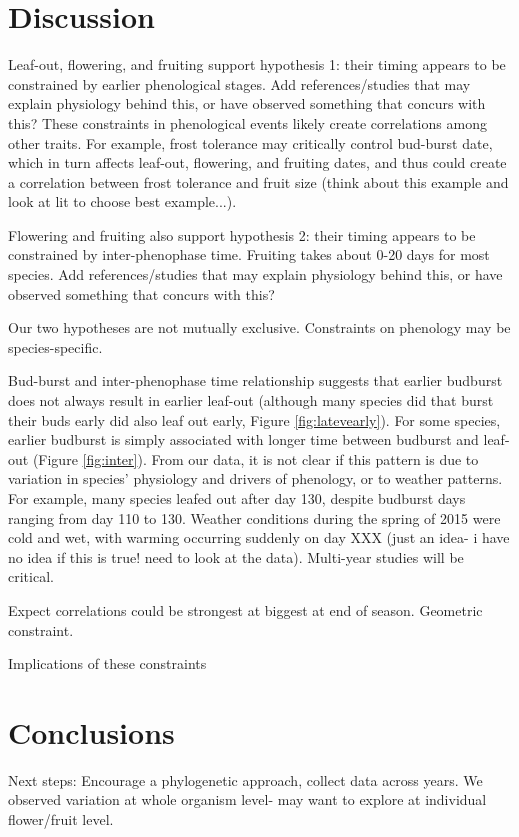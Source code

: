 \documentclass{article}
\begin{document}
\section* {Discussion}

Leaf-out, flowering, and fruiting support hypothesis 1: their timing appears to be constrained by earlier phenological stages.  
Add references/studies that may explain physiology behind this, or have observed something that concurs with this? These constraints in phenological events likely create correlations among other traits. For example, frost tolerance may critically control bud-burst date, which in turn affects leaf-out, flowering, and fruiting dates, and thus could create a correlation between frost tolerance and fruit size (think about this example and look at lit to choose best example...).
\par Flowering and fruiting also support hypothesis 2: their timing appears to be constrained by inter-phenophase time. Fruiting takes about 0-20 days for most species. Add references/studies that may explain physiology behind this, or have observed something that concurs with this?

\par Our two hypotheses are not mutually exclusive. Constraints on phenology may be species-specific. 
\par Bud-burst and inter-phenophase time relationship suggests that earlier budburst does not always result in earlier leaf-out (although many species did that burst their buds early did also leaf out early, Figure \ref{fig:latevearly}). For some species, earlier budburst is simply associated with longer time between budburst and leaf-out (Figure \ref{fig:inter}). From our data, it is not clear if this pattern is due to variation in species' physiology and drivers of phenology, or to weather patterns. For example, many species leafed out after day 130, despite budburst days ranging from day 110 to 130. Weather conditions during the spring of 2015 were cold and wet, with warming occurring suddenly on day XXX (just an idea- i have no idea if this is true! need to look at the data). Multi-year studies will be critical. 
\par Expect correlations could be strongest  at biggest at end of season. Geometric constraint.
\par Implications of these constraints
\section* {Conclusions}
Next steps: Encourage a phylogenetic approach, collect data across years. We observed variation at whole organism level- may want to explore at individual flower/fruit level. 
\end{document}
